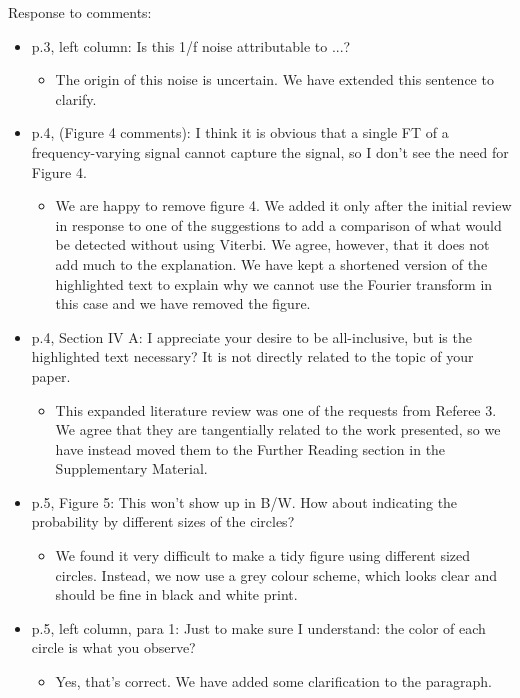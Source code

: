 \documentclass[a4paper, 10pt]{letter}
\begin{document}
Response to comments:
\begin{itemize}
\item p.3, left column: Is this 1/f noise attributable to ...?
\begin{itemize}
\item The origin of this noise is uncertain. We have extended this sentence to clarify. 
\end{itemize}

\item p.4, (Figure 4 comments):  I think it is obvious that a single FT of a frequency-varying signal cannot capture the signal, so I don't see the need for Figure 4. 
\begin{itemize}
\item We are happy to remove figure 4. We added it only after the initial review in response to one of the suggestions to add a comparison of what would be detected without using Viterbi. We agree, however, that it does not add much to the explanation. We have kept a shortened version of the highlighted text to explain why we cannot use the Fourier transform in this case and we have removed the figure. 
\end{itemize}

\item p.4, Section IV A: I appreciate your desire to be all-inclusive, but is the highlighted text necessary? It is not directly related to the topic of your paper. 
\begin{itemize}
\item This expanded literature review was one of the requests from Referee 3. We agree that they are tangentially related to the work presented, so we have instead moved them to the Further Reading section in the Supplementary Material. 
\end{itemize}

\item p.5, Figure 5: This won't show up in B/W. How about indicating the probability by different sizes of the circles? 
\begin{itemize}
\item We found it very difficult to make a tidy figure using different sized circles. Instead, we now use a grey colour scheme, which looks clear and should be fine in black and white print. 
\end{itemize}

\item p.5, left column, para 1: Just to make sure I understand: the color of each circle is what you observe?
\begin{itemize}
\item Yes, that's correct. We have added some clarification to the paragraph.
\end{itemize}


\end{itemize}
\end{document}
